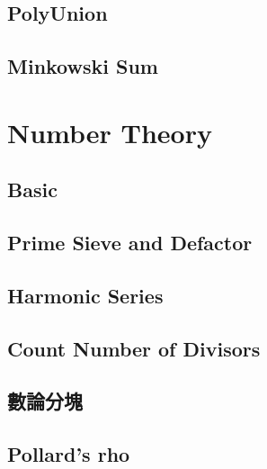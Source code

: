 \documentclass[a4paper,10pt,twocolumn,oneside]{article}
\begin{document}
\subsection{PolyUnion}


% 

\subsection{Minkowski Sum}







\section{Number Theory}

\subsection{Basic}


\subsection{Prime Sieve and Defactor}


\subsection{Harmonic Series}


\subsection{Count Number of Divisors}


\subsection{數論分塊}



\subsection{Pollard's rho}


\end{document}
